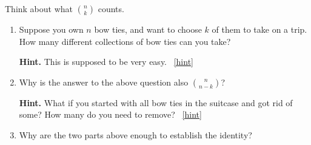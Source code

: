 \documentclass{book}
\begin{document}
\setcounter{project}{74}
\addtocounter{project}{-1}
\begin{activity}[]\label{act-pascalsym-dc}
\hypertarget{p-585}{}%
Think about what \(\binom{n}{k}\) counts.%
\begin{enumerate}[font=\bfseries,label=(\alph*),ref=\alph*]
\item\label{task-105} \hypertarget{p-586}{}%
Suppose you own \(n\) bow ties, and want to choose \(k\) of them to take on a trip.  How many different collections of bow ties can you take?%
\par\smallskip%
\noindent\textbf{Hint.}\hypertarget{hint-29}{}\quad%
\hypertarget{p-587}{}%
This is supposed to be very easy.%
~\hfill{\tiny\hyperlink{a-74.a}{[hint]}\hypertarget{q-74.a}{}}\item\label{task-106} \hypertarget{p-588}{}%
Why is the answer to the above question also \(\binom{n}{n-k}\)?%
\par\smallskip%
\noindent\textbf{Hint.}\hypertarget{hint-30}{}\quad%
\hypertarget{p-589}{}%
What if you started with all bow ties in the suitcase and got rid of some?  How many do you need to remove?%
~\hfill{\tiny\hyperlink{a-74.b}{[hint]}\hypertarget{q-74.b}{}}\item\label{task-107} \hypertarget{p-590}{}%
Why are the two parts above enough to establish the identity?%
\end{enumerate}
\end{activity}
\end{document}
